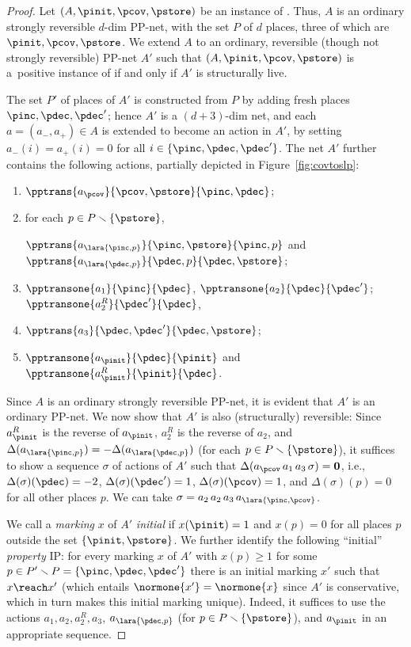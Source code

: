 \begin{proof}
	Let $(A,\pinit, \pcov, \pstore)$ be an instance of \PPSCover. Thus, $A$
is an ordinary strongly reversible $d$-dim PP-net, with the set $P$ of
	$d$ places, three of which are 
 $\pinit, \pcov, \pstore$.
	We extend $A$ to an ordinary, reversible (though not
	strongly reversible) PP-net $A'$ such that 
	$(A,\pinit, \pcov, \pstore)$ is a~positive instance of \PPSCover if and
only if $A'$ is structurally live.

The set $P'$ of places of $A'$ is constructed from $P$ by adding 
	fresh places  $\pinc,\pdec,\pdec'$; hence $A'$ is a
	$(d{+}3)$-dim net,  
	and each $a=(a_-,a_+)\in A$ is extended to become an
	action in $A'$, by setting $a_-(i)=a_+(i)=0$ for
	all $i\in\{\pinc,\pdec,\pdec'\}$.
The net $A'$ further contains
the following actions,
partially depicted in Figure~\ref{fig:covtoslp}:
    \begin{enumerate}
        \item 
        $\pptrans{a_\pcov}{\pcov,\pstore}{\pinc,\pdec}$;
\item for each $p \in P \smallsetminus \{\pstore\}$,	    
	\begin{center}
	$\pptrans{a_\lara{\pinc,p}}{\pinc,\pstore}{\pinc,p}$
    and
	$\pptrans{a_\lara{\pdec,p}}{\pdec,p}{\pdec,\pstore}$;
	\end{center}		    
\item        $\pptransone{a_1}{\pinc}{\pdec}$,
		$\pptransone{a_2}{\pdec}{\pdec'}$;
        $\pptransone{a^R_2}{\pdec'}{\pdec}$,
\item
	$\pptrans{a_3}{\pdec,\pdec'}{\pdec,\pstore}$;
        \item 
        $\pptransone{a_\pinit}{\pdec}{\pinit}$
        and
        $\pptransone{a_\pinit^R}{\pinit}{\pdec}$.
    \end{enumerate}
Since $A$ is an ordinary strongly reversible PP-net,
it is evident that $A'$ is an ordinary PP-net. We now show that $A'$
	is also (structurally) reversible:
Since $a^R_\pinit$ is the reverse of $a_\pinit$, 
	$a^R_2$ is the reverse of $a_2$, and
	$\Delta(a_\lara{\pinc,p})=-\Delta(a_\lara{\pdec,p})$ (for each $p\in
	P\smallsetminus\{\pstore\}$),
it suffices to show a sequence $\sigma$ of actions of $A'$ such that 
	$\Delta(a_\pcov\,a_1\,a_3\,\sigma)=\mathbf{0}$, i.e.,
$\Delta(\sigma)(\pdec)=-2$, $\Delta(\sigma)(\pdec')=1$,
	$\Delta(\sigma)(\pcov)=1$, and 
	$\Delta(\sigma)(p)=0$
	for all other places $p$.
We can take 
	$\sigma=a_2\, a_2\, a_3\, a_\lara{\pinc,\pcov}$.

We call a \emph{marking} $x$ of $A'$ \emph{initial} if
$x(\pinit)=1$ and $x(p)=0$ for all places $p$ outside the set
$\{\pinit,\pstore\}$. We further identify the following ``initial'' \emph{property} \textsc{IP}: 
for every marking
	$x$ of $A'$ with $x(p)\geq 1$ for some
	$p\in P'\smallsetminus P=\{\pinc,\pdec,\pdec'\}$ there is  an initial marking $x'$
	such that $x\reach x'$ (which entails
	$\normone{x'}=\normone{x}$ since $A'$ is conservative, which
	in turn makes this initial marking unique).
	 Indeed, it suffices to use the
	actions $a_1,a_2,a^R_2,a_3$, $a_\lara{\pdec,p}$ (for $p\in
	P\smallsetminus\{\pstore\}$), and $a_\pinit$ in an appropriate sequence.


\end{proof}
